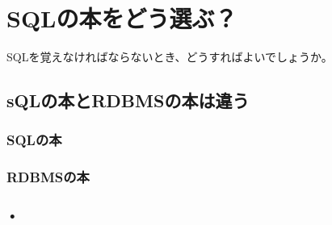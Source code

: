 \chapter{SQLの本をどう選ぶ？}

SQLを覚えなければならないとき、どうすればよいでしょうか。

\section{sQLの本とRDBMSの本は違う}

\subsection{SQLの本}

\subsection{RDBMSの本}

\subsection{•}